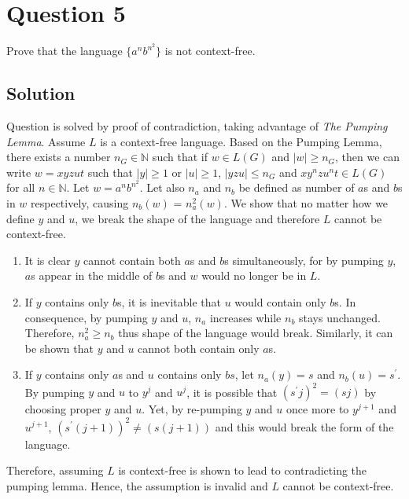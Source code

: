 
\section*{Question 5}

Prove that the language $\{ a^n b^{n^2} \}$ is not context-free.

\subsection*{Solution}

Question is solved by proof of contradiction, taking advantage of \textit{The Pumping Lemma}.
Assume $L$ is a context-free language.
Based on the Pumping Lemma, there exists a number $n_G \in \mathbb{N}$ such that if $w \in L(G)$ and $|w| \geq n_G$, then we can write $w = xyzut$ such that $|y| \geq 1$ or $|u| \geq 1$, $|yzu| \leq n_G$ and $xy^nzu^nt \in L(G)$ for all $n \in \mathbb{N}$.
Let $w = a^nb^{n^2}$.
Let also $n_a$ and $n_b$ be defined as number of $a$s and $b$s in $w$ respectively, causing $n_b(w)$ = $n_a^2(w)$.
We show that no matter how we define $y$ and $u$, we break the shape of the language and therefore $L$ cannot be context-free.

\begin{enumerate}

	\item
	It is clear $y$ cannot contain both $a$s and $b$s simultaneously, for by pumping $y$, $a$s appear in the middle of $b$s and $w$ would no longer be in $L$.

	\item
	If $y$ contains only $b$s, it is inevitable that $u$ would contain only $b$s.
	In consequence, by pumping $y$ and $u$, $n_a$ increases while $n_b$ stays unchanged.
	Therefore, $n_a^2 \ge n_b$ thus shape of the language would break.
	Similarly, it can be shown that $y$ and $u$ cannot both contain only $a$s.

	\item
	If $y$ contains only $a$s and $u$ contains only $bs$, let $n_a(y) = s$ and $n_b(u) = s^\prime$.
	By pumping $y$ and $u$ to $y^j$ and $u^j$, it is possible that $(s^\prime j)^2 = (sj)$ by choosing proper $y$ and $u$.
	Yet, by re-pumping $y$ and $u$ once more to $y^{j+1}$ and $u^{j+1}$, $(s^\prime(j+1))^2 \neq (s(j+1))$ and this would break the form of the language.

\end{enumerate}

Therefore, assuming $L$ is context-free is shown to lead to contradicting the pumping lemma.
Hence, the assumption is invalid and $L$ cannot be context-free.
